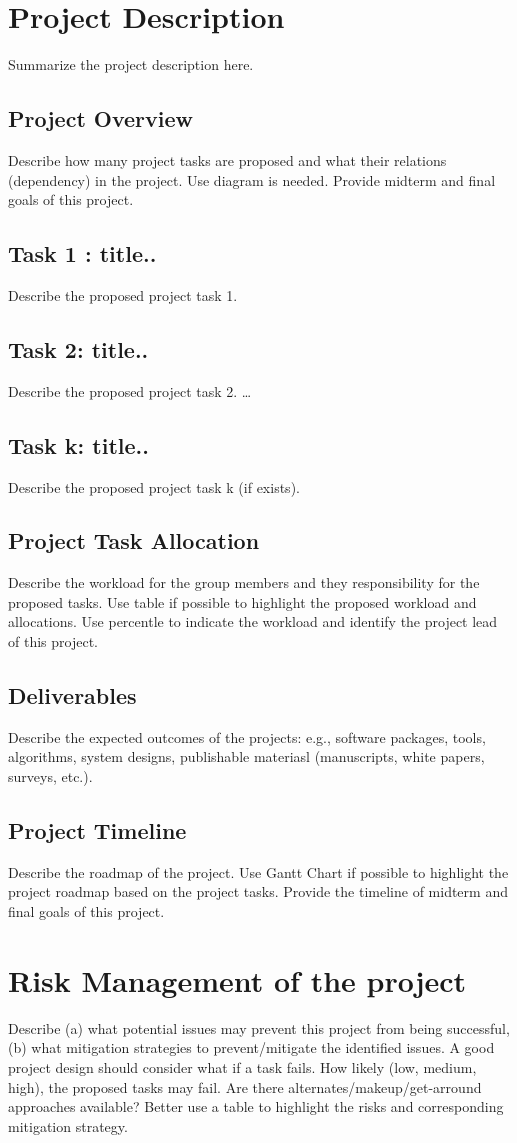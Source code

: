 \documentclass[conference,12pt]{IEEEtran}
\begin{document}
\section{Project Description}
Summarize the project description here.
\subsection{Project Overview}
Describe how many project tasks are proposed and what their relations (dependency) in the project. Use diagram is needed. Provide midterm and final goals of this project.
\subsection{Task 1 : title..}
Describe the proposed project task 1.
\subsection{Task 2: title..}
Describe the proposed project task 2.
\dots
\subsection{Task k: title..}
Describe the proposed project task k (if exists).
\subsection{Project Task Allocation}
Describe the workload for the group members and they responsibility for the proposed tasks. Use table if possible to highlight the proposed workload and allocations. Use percentle to indicate the workload and identify the project lead of this project.
\subsection{Deliverables}
Describe the expected outcomes of the projects: e.g., software packages, tools, algorithms, system designs, publishable materiasl (manuscripts, white papers, surveys, etc.).
\subsection{Project Timeline}
Describe the roadmap of the project. Use Gantt Chart if possible to highlight the project roadmap based on the project tasks. Provide the timeline of midterm and final goals of this project.
\section{Risk Management of the project}
Describe (a) what potential issues may prevent this project from being successful, (b) what mitigation strategies to prevent/mitigate the identified issues. A good project design should consider what if a task fails. How likely (low, medium, high), the proposed tasks may fail. Are there alternates/makeup/get-arround approaches available? Better use  a table to highlight the risks and corresponding mitigation strategy.
\end{document}
